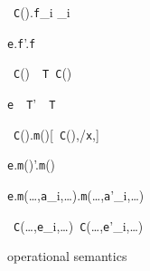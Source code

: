 \begin{figure*}
\begin{minipage}{.4\textwidth}
\quad{}
	{\new~{\tt C}().{\tt f}_i _i}

	{{\tt e}.{\tt f}'.{\tt f}}

	{\new~{\tt C}()~\as~{\tt T}\derives\new~{\tt C}()}

	{{\tt e}~\as~{\tt T}'~\as~{\tt T}}

\end{minipage}%
\begin{minipage}{.6\textwidth}
\quad{}
	{\new~{\tt C}().{\tt m}()[\new~{\tt C}(),/{\tt x},]}

	{{\tt e}.{\tt m}()'.{\tt m}()}

	{{\tt e}.{\tt m}(\ldots,{\tt a}_i,\ldots).{\tt m}(\ldots,{\tt a}'_i,\ldots)}

	{\new~{\tt C}(\ldots,{\tt e}_i,\ldots)\derives\new~{\tt C}(\ldots,{\tt e}'_i,\ldots)}
\end{minipage}
\caption{\FX{} operational semantics}
\label{fig:sos}
\end{figure*}


